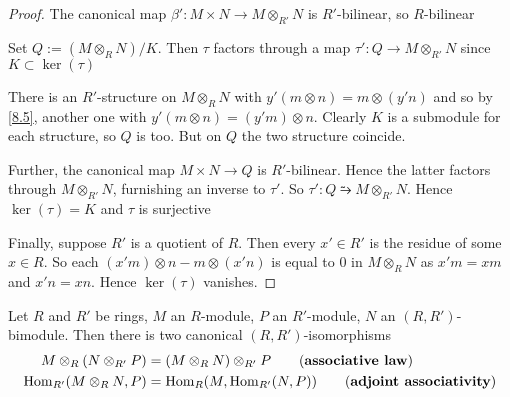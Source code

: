 \documentclass[11pt]{article}
\begin{document}
\begin{proof}
The canonical map \(\beta':M\times N\to M\otimes_{R'}N\) is \(R'\)-bilinear,
so \(R\)-bilinear

Set \(Q:=(M\otimes_R N)/K\). Then \(\tau\) factors through a map \(\tau':Q\to
   M\otimes_{R'}N\) since \(K\subset\ker(\tau)\)

There is an \(R'\)-structure on \(M\otimes_R N\) with \(y'(m\otimes
   n)=m\otimes(y'n)\) and so by \ref{8.5}, another one with \(y'(m\otimes
   n)=(y'm)\otimes n\). Clearly \(K\) is a submodule for each structure, so
\(Q\) is too. But on \(Q\) the two structure coincide.

Further, the canonical
map \(M\times N\to Q\) is \(R'\)-bilinear. Hence the latter factors through
\(M\otimes_{R'}N\), furnishing an inverse to \(\tau'\). So
\(\tau':Q\similarrightarrow M\otimes_{R'}N\). Hence \(\ker(\tau)=K\) and \(\tau\) is
surjective

Finally, suppose \(R'\) is a quotient of \(R\). Then every \(x'\in R'\) is
the residue of some \(x\in R\). So each \((x'm)\otimes n-m\otimes(x'n)\) is
equal to 0 in \(M\otimes_R N\) as \(x'm=xm\) and \(x'n=xn\). Hence
\(\ker(\tau)\) vanishes.
\end{proof}

\begin{theorem}[]
Let \(R\) and \(R'\) be rings, \(M\) an \(R\)-module, \(P\) an \(R'\)-module,
\(N\) an \((R,R')\)-bimodule. Then there is two canonical
\((R,R')\)-isomorphisms
\begin{align*}
M\otimes_R(N\otimes_{R'}P)&=(M\otimes_RN)\otimes_{R'}P\tag*{(\textbf{associative law})}\\
\Hom_{R'}(M\otimes_RN,P)&=\Hom_R(M,\Hom_{R'}(N,P))\tag*{(\textbf{adjoint associativity})}
\end{align*}
\end{theorem}
\end{document}
